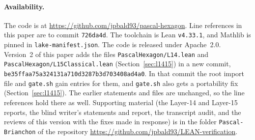 \documentclass[11pt]{article}
\theoremstyle{remark}
\newcommand{\lean}[1]{\texttt{#1}}
\newcommand{\repo}{https://github.com/jpbald93/pascal-hexagon}
\newcommand{\commit}{726da4d}
\begin{document}
\paragraph{Availability.}
The code is at \url{\repo}. Line references in this paper are to commit \texttt{\commit}. The
toolchain is Lean \texttt{v4.33.1}, and Mathlib is pinned in \texttt{lake-manifest.json}. The code is
released under Apache~2.0. Version~2 of this paper adds the files \lean{PascalHexagon/L14.lean} and
\lean{PascalHexagon/L15Classical.lean} (Section~\ref{sec:l1415}) in a new commit, \texttt{be35ffaa75a324131a710d3287b3d703408ad4a0}.
In that commit the root import file and \texttt{gate.sh} gain entries for them, and \texttt{gate.sh}
also gets a portability fix (Section~\ref{sec:l1415}). The earlier statements and files are
unchanged, so the line references hold there as well.
Supporting material (the Layer-14 and Layer-15 reports, the blind writer's statements and report, the transcript audit, and the reviews of this version with the fixes made in response) is in the folder \texttt{Pascal-Brianchon} of the repository \url{https://github.com/jpbald93/LEAN-verification}.
\end{document}
